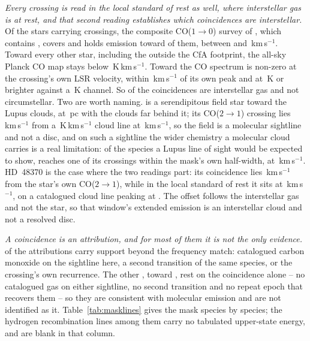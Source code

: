 \emph{Every crossing is read in the local standard of rest as well, where
interstellar gas is at rest, and that second reading
establishes which coincidences are interstellar.} Of the \LsNLos{} stars carrying crossings, the composite
CO($1\to0$) survey of \citet{DameThaddeus2022}, which contains
\citet{Dame2001}, covers \LsNLosCov{} and holds emission toward \LsNLosDet{}
of them, between \LsCoVLo{} and \LsCoVHi\,km\,s$^{-1}$. Toward every other
star, including the \LsNLosOut{} outside the CfA footprint, the all-sky
Planck CO map \citep{PlanckCO2016} stays below
\LsPlanckMax\,K\,km\,s$^{-1}$. Toward
\LsCloudStars{} the CO spectrum is non-zero at the crossing's own LSR
velocity, within \LsCloudDvMax\,km\,s$^{-1}$ of its own peak and at
\LsCloudTMin\,K or brighter against a \LsCoRms\,K channel. So \LsNCloud{} of
the \MkNCoinc{} coincidences are interstellar gas and not circumstellar.
Two are worth naming. \BkAlmaName{} is a serendipitous field star toward the
Lupus clouds, at \BkAlmaDistPc\,pc with the clouds far behind it; its
CO($2\to1$) crossing lies \LsLupDv\,km\,s$^{-1}$ from a
\LsLupWco\,K\,km\,s$^{-1}$ cloud line at \LsLupVco\,km\,s$^{-1}$, so the
field is a molecular sightline and not a disc, and on such a sightline the
wider chemistry a molecular cloud carries is a real limitation: of the
species a Lupus line of sight would be expected to show, \XlLupNamedN{}
reaches one of its crossings within the mask's own half-width,
\XlLupNamedMol{} at \XlLupNamedDv\,km\,s$^{-1}$. HD~48370 is
the case where the two readings part: its coincidence lies
\LsHdDvStar\,km\,s$^{-1}$ from the star's own CO($2\to1$), while in the local
standard of rest it sits at \LsHdVfeat\,km\,s$^{-1}$, on a catalogued cloud
line peaking at \LsHdVco. The offset follows the interstellar gas and not the
star, so that window's extended emission is an interstellar cloud and not
a resolved disc.

\emph{A coincidence is an attribution, and for most of them it is not the
only evidence.} \LnAttrSupp{} of the \MkAttr{} attributions carry support
beyond the frequency match: catalogued carbon monoxide on the sightline here,
a second transition of the same species, or the crossing's own recurrence.
The other \LnAttrCoincWord, toward \LnCoincStars, rest on the coincidence
alone -- no catalogued gas on either sightline, no second transition and no
repeat epoch that recovers them -- so they are consistent with molecular
emission and are not identified as it. Table~\ref{tab:masklines} gives the
mask species by species; the hydrogen recombination lines among them carry
no tabulated upper-state energy, and are blank in that column.

